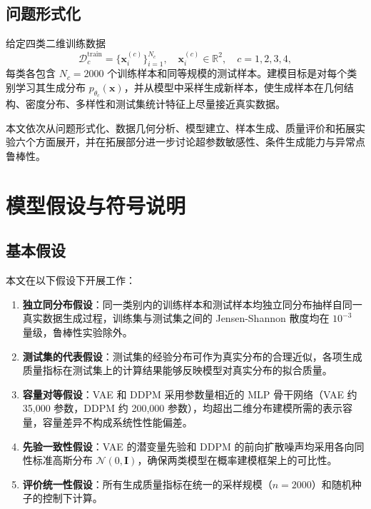 \documentclass[10pt, a4paper, oneside]{ctexart}
\numberwithin{equation}{section}
\numberwithin{table}{section}
\numberwithin{figure}{section}
\newcommand{\R}{\mathbb{R}}
\newcommand{\Ncal}{\mathcal{N}}
\newcommand{\vect}[1]{\mathbf{#1}}
\begin{document}
\subsection{问题形式化}

给定四类二维训练数据
\begin{equation}
    \mathcal{D}_c^{\text{train}} = \{\vect{x}_i^{(c)}\}_{i=1}^{N_c},\quad
    \vect{x}_i^{(c)}\in\R^2,\quad c=1,2,3,4,
\end{equation}
每类各包含 $N_c=2000$ 个训练样本和同等规模的测试样本。建模目标是对每个类别学习其生成分布 $p_{\theta_c}(\vect{x})$，并从模型中采样生成新样本，使生成样本在几何结构、密度分布、多样性和测试集统计特征上尽量接近真实数据。

本文依次从问题形式化、数据几何分析、模型建立、样本生成、质量评价和拓展实验六个方面展开，并在拓展部分进一步讨论超参数敏感性、条件生成能力与异常点鲁棒性。

\section{模型假设与符号说明}

\subsection{基本假设}

本文在以下假设下开展工作：

\begin{enumerate}[label=(\arabic*)]
    \item \textbf{独立同分布假设}：同一类别内的训练样本和测试样本均独立同分布抽样自同一真实数据生成过程，训练集与测试集之间的 Jensen-Shannon 散度均在 $10^{-3}$ 量级，鲁棒性实验除外。
    \item \textbf{测试集的代表假设}：测试集的经验分布可作为真实分布的合理近似，各项生成质量指标在测试集上的计算结果能够反映模型对真实分布的拟合质量。
    \item \textbf{容量对等假设}：VAE 和 DDPM 采用参数量相近的 MLP 骨干网络（VAE 约 35,000 参数，DDPM 约 200,000 参数），均超出二维分布建模所需的表示容量，容量差异不构成系统性性能偏差。
    \item \textbf{先验一致性假设}：VAE 的潜变量先验和 DDPM 的前向扩散噪声均采用各向同性标准高斯分布 $\Ncal(0,\vect{I})$，确保两类模型在概率建模框架上的可比性。
    \item \textbf{评价统一性假设}：所有生成质量指标在统一的采样规模（$n=2000$）和随机种子的控制下计算。
\end{enumerate}
\end{document}
